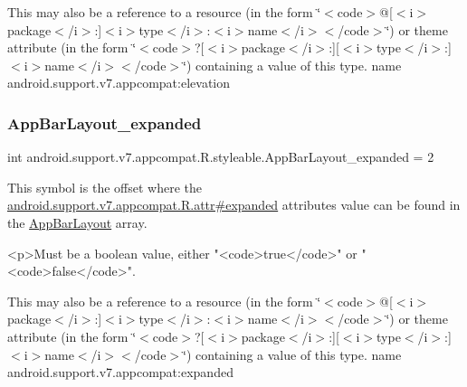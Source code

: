 This may also be a reference to a resource (in the form \char`\"{}$<$code$>$@\mbox{[}$<$i$>$package$<$/i$>$\+:\mbox{]}$<$i$>$type$<$/i$>$\+:$<$i$>$name$<$/i$>$$<$/code$>$\char`\"{}) or theme attribute (in the form \char`\"{}$<$code$>$?\mbox{[}$<$i$>$package$<$/i$>$\+:\mbox{]}\mbox{[}$<$i$>$type$<$/i$>$\+:\mbox{]}$<$i$>$name$<$/i$>$$<$/code$>$\char`\"{}) containing a value of this type.  name android.\+support.\+v7.\+appcompat\+:elevation \mbox{\label{classandroid_1_1support_1_1v7_1_1appcompat_1_1R_1_1styleable_ab1802dee91330b4d0be4959f1d92c9da}} 
\subsubsection{\texorpdfstring{App\+Bar\+Layout\+\_\+expanded}{AppBarLayout\_expanded}}
{\footnotesize\ttfamily int android.\+support.\+v7.\+appcompat.\+R.\+styleable.\+App\+Bar\+Layout\+\_\+expanded = 2\hspace{0.3cm}{\ttfamily [static]}}

This symbol is the offset where the \hyperlink{classandroid_1_1support_1_1v7_1_1appcompat_1_1R_1_1attr_a7837ae33f7b43370d81f841bd1cb2f95}{android.\+support.\+v7.\+appcompat.\+R.\+attr\#expanded} attribute\textquotesingle{}s value can be found in the \hyperlink{classandroid_1_1support_1_1v7_1_1appcompat_1_1R_1_1styleable_a4a6b654a45dba60e2dbee9ce169563e2}{App\+Bar\+Layout} array.

\begin{DoxyVerb}      <p>Must be a boolean value, either "<code>true</code>" or "<code>false</code>".
\end{DoxyVerb}
 

This may also be a reference to a resource (in the form \char`\"{}$<$code$>$@\mbox{[}$<$i$>$package$<$/i$>$\+:\mbox{]}$<$i$>$type$<$/i$>$\+:$<$i$>$name$<$/i$>$$<$/code$>$\char`\"{}) or theme attribute (in the form \char`\"{}$<$code$>$?\mbox{[}$<$i$>$package$<$/i$>$\+:\mbox{]}\mbox{[}$<$i$>$type$<$/i$>$\+:\mbox{]}$<$i$>$name$<$/i$>$$<$/code$>$\char`\"{}) containing a value of this type.  name android.\+support.\+v7.\+appcompat\+:expanded \mbox{\label{classandroid_1_1support_1_1v7_1_1appcompat_1_1R_1_1styleable_a4a7cc1057032876bdbbf3596c54747f4}} 
